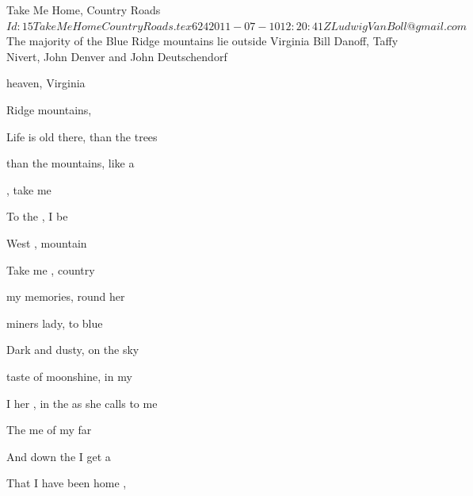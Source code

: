 \begin{SBSong}{Take Me Home, Country Roads}
  {$Id: 15TakeMeHomeCountryRoads.tex 624 2011-07-10 12:20:41Z LudwigVanBoll@gmail.com $}
  {The majority of the Blue Ridge mountains lie outside Virginia}
  {Bill Danoff, Taffy Nivert, John Denver and John Deutschendorf}
  \begin{SBVerse}
     heaven,  Virginia
    
     Ridge mountains,  
    
    Life is old there,  than the trees
    
     than the mountains,  like a 
  \end{SBVerse}
  \begin{SBChorus}
    , take me 
    
	To the , I be
	
	West , mountain 
	
	Take me , country 
  \end{SBChorus}
  \begin{SBVerse}
     my memories,  round her
    
     miners lady,  to blue 
    
    Dark and dusty,  on the sky
    
     taste of moonshine,  in my 
  \end{SBVerse}
  \begin{SBVerse}
    I  her , in the  as she calls to me
    
    The   me of my  far 
    
    And  down the  I get a 
    
    That I  have been home ,  
  \end{SBVerse}
\end{SBSong}
